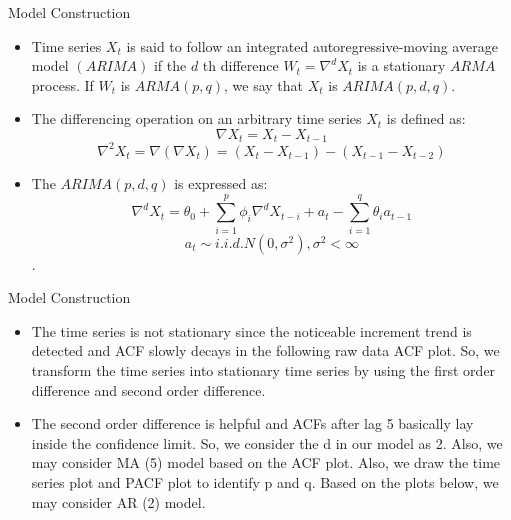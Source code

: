 \documentclass{beamer}
\begin{document}
\begin{frame}{Model Construction}
\begin{itemize}
    \item Time series $X_{t}$ is said to follow an integrated autoregressive-moving average model $(ARIMA)$ if the $d$ th difference ${W_{t}} = \nabla ^dX_{t}$ is a stationary $ARMA$ process. If $W_{t}$ is $ARMA(p,q)$, we say that ${X_{t}}$ is $ARIMA(p,d,q)$.
    \item The differencing operation on an arbitrary time series $X_{t}$ is defined as:\[\nabla X_{t} = X_{t}-X_{t-1}\] \[\nabla^2X_{t} =\nabla(\nabla X_{t}) = (X_{t}-X_{t-1})- (X_{t-1}-X_{t-2})\]
    \item The $ARIMA(p,d,q)$ is expressed as: \[\nabla ^dX_{t} =\theta_{0}+\sum_{i=1}^{p}\phi_{i}\nabla^dX_{t-i}+a_{t}-\sum_{i=1}^{q}\theta_{i}a_{t-1}\] \[a_{t} \sim i.i.d.N(0,\sigma^2),\sigma^2<\infty\].
    
\end{itemize}
 
\end{frame}
\begin{frame}{Model Construction}
\begin{itemize}
    \item The time series is not stationary since the noticeable increment trend is detected and ACF slowly decays in the following raw data ACF plot. So, we transform the time series into stationary time series by using the first order difference and second order difference.
    \item The second order difference is helpful and ACFs after lag 5 basically lay inside the confidence limit. So, we consider the d in our model as 2. Also, we may consider MA (5) model based on the ACF plot. Also, we draw the time series plot and PACF plot to identify p and q. Based on the plots below, we may consider AR (2) model. 

    
\end{itemize}
    
\end{frame}
\end{document}
